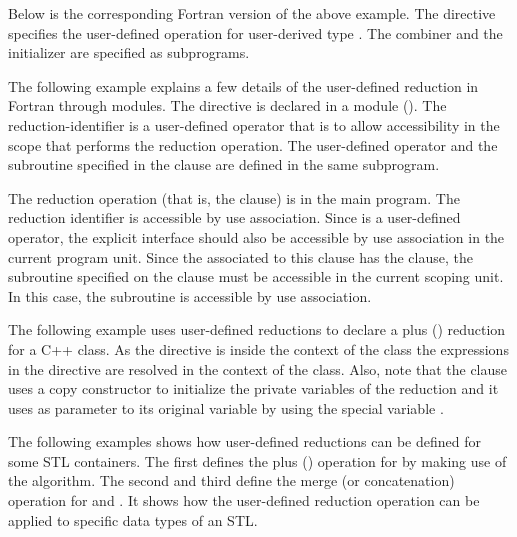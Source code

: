 
Below is the corresponding Fortran version of the above example.  The 
 directive specifies the user-defined operation 
 for user-derived type .  The combiner 
 and the initializer  are specified as 
subprograms.



The following example explains a few details of the user-defined reduction 
in Fortran through modules. The  directive is declared in a module (). 
The reduction-identifier  is a user-defined operator that is
to allow accessibility in the scope that performs the reduction
operation.
The user-defined operator  and the subroutine  specified in the  clause are defined in the same subprogram.

The reduction operation (that is, the  clause) is in the main program.
The reduction identifier  is accessible by use association.
Since  is a user-defined operator, the explicit interface
should also be accessible by use association in the current
program unit.
Since the  associated to this  clause
has the  clause, the subroutine specified on the clause
must be accessible in the current scoping unit.  In this case,
the subroutine  is accessible by use association.



The following example uses user-defined reductions to declare a plus (\kcode{+}) 
reduction for a C++ class. As the  directive is inside 
the context of the  class the expressions in the  directive are resolved in the context of the class. Also, note that 
the  clause uses a copy constructor to initialize the 
private variables of the reduction and it uses as parameter to its original 
variable by using the special variable .


The following examples shows how user-defined reductions can be defined for 
some STL containers. The first  defines the plus
(\kcode{+}) 
operation for  by making use of the 
 algorithm. The second and third define the merge 
(or concatenation) operation for  and 
. 
It shows how the user-defined reduction operation can be applied to specific data types of an STL.



